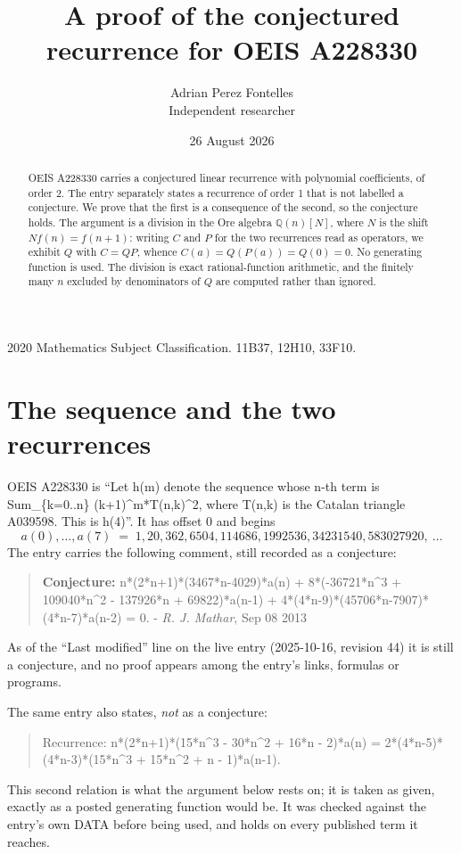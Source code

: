 \documentclass[11pt,a4paper]{article}
\title{A proof of the conjectured recurrence for OEIS A228330}
\author{Adrian Perez Fontelles\\ \small Independent researcher}
\date{26 August 2026}
\theoremstyle{plain}
\theoremstyle{definition}
\begin{document}
\maketitle

\begin{abstract}
OEIS A228330 carries a conjectured linear recurrence with polynomial coefficients, of
order 2. The entry separately states a recurrence of order 1 that is not
labelled a conjecture. We prove that the first is a consequence of the second, so the
conjecture holds. The argument is a division in the Ore algebra
$\mathbb{Q}(n)[N]$, where $N$ is the shift $Nf(n)=f(n+1)$: writing $C$ and $P$ for the two
recurrences read as operators, we exhibit $Q$ with $C=QP$, whence
$C(a)=Q(P(a))=Q(0)=0$. No generating function is used. The division is exact
rational-function arithmetic, and the finitely many $n$ excluded by denominators of $Q$
are computed rather than ignored.
\end{abstract}

\noindent\small 2020 Mathematics Subject Classification. 11B37, 12H10, 33F10.\normalsize

\section{The sequence and the two recurrences}

OEIS A228330 is ``Let h(m) denote the sequence whose n-th term is Sum\_\{k=0..n\} (k+1)\^{}m*T(n,k)\^{}2, where T(n,k) is the Catalan triangle A039598. This is h(4)''. It has offset $0$ and begins
\[
a(0),\dots,a(7)\;=\;1, 20, 362, 6504, 114686, 1992536, 34231540, 583027920,\ \dots
\]
The entry carries the following comment, still recorded as a conjecture:
\begin{quote}\small
\textbf{Conjecture:} n*(2*n+1)*(3467*n-4029)*a(n) + 8*(-36721*n\^{}3 + 109040*n\^{}2 - 137926*n + 69822)*a(n-1) + 4*(4*n-9)*(45706*n-7907)*(4*n-7)*a(n-2) = 0. - \emph{R. J. Mathar}, Sep 08 2013
\end{quote}
As of the ``Last modified'' line on the live entry (2025-10-16, revision 44) it is still
a conjecture, and no proof appears among the entry's links, formulas or programs.

The same entry also states, \emph{not} as a conjecture:
\begin{quote}\small
Recurrence: n*(2*n+1)*(15*n\^{}3 - 30*n\^{}2 + 16*n - 2)*a(n) = 2*(4*n-5)*(4*n-3)*(15*n\^{}3 + 15*n\^{}2 + n - 1)*a(n-1).
\end{quote}
This second relation is what the argument below rests on; it is taken as given, exactly as
a posted generating function would be. It was checked against the entry's own DATA before
being used, and holds on every published term it reaches.
\end{document}
